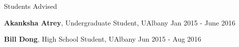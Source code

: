 \documentclass{resume} %
\begin{document}
\begin{rSection}{Students Advised}
\begin{list}{}{\leftmargin=1em}
   \item \textbf{Akanksha Atrey}, Undergraduate Student, UAlbany \hfill Jan 2015 - June 2016

   \item \textbf{Bill Dong}, High School Student, UAlbany \hfill Jun 2015 - Aug 2016
\end{list}

\end{rSection}


%
\end{document}

